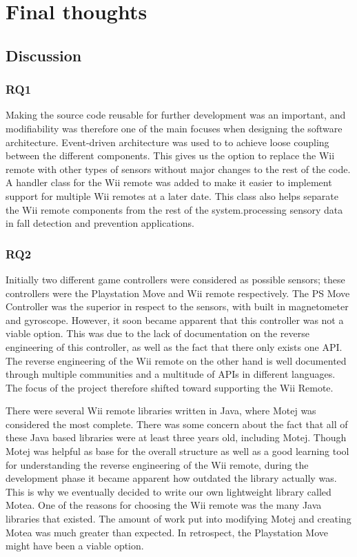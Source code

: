 \chapter{Final thoughts}

\section{Discussion}

\subsection{RQ1}
Making the source code reusable for further development was an important, and modifiability was therefore one of the main focuses when designing the software architecture. Event-driven architecture was used to to achieve loose coupling between the different components. This gives us the option to replace the Wii remote with other types of sensors without major changes to the rest of the code. A handler class for the Wii remote was added to make it easier to implement support for multiple Wii remotes at a later date. This class also helps separate the Wii remote components from the rest of the system.processing sensory data in fall detection and prevention applications.

\subsection{RQ2}
Initially two different game controllers were considered as possible sensors; these controllers were the Playstation Move and Wii remote respectively. The PS Move Controller was the superior in respect to the sensors, with built in magnetometer and gyroscope. However, it soon became apparent that this controller was not a viable option. This was due to the lack of documentation on the reverse engineering of this controller, as well as the fact that there only exists one API. The reverse engineering of the Wii remote on the other hand is well documented through multiple communities and a multitude of APIs in different languages. The focus of the project therefore shifted toward supporting the Wii Remote.

There were several Wii remote libraries written in Java, where Motej was considered the most complete. There was some concern about the fact that all of these Java based libraries were at least three years old, including Motej. Though Motej was helpful as base for the overall structure as well as a good learning tool for understanding the reverse engineering of the Wii remote, during the development phase it became apparent how outdated the library actually was. This is why we eventually decided to write our own lightweight library called Motea. One of the reasons for choosing the Wii remote was the many Java libraries that existed. The amount of work put into modifying Motej and creating Motea was much greater than expected. In retrospect, the Playstation Move might have been a viable option.

